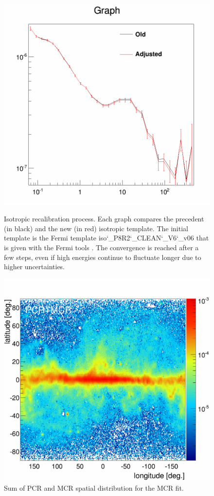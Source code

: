 \begin{figure}[H]
\begin{minipage}[h]{0.45\textwidth}
 	\subcaption{}
  	\label{app:app_iso_process_3}
  \end{minipage}
  \hfill
  \begin{minipage}[h]{0.45\textwidth}
  	\centering
	\includegraphics[width=1\linewidth]{pic/method/app_iso_process_4.png}
  	\subcaption{}
  	\label{app:app_iso_process_4}
  \end{minipage}
  \caption[Isotropic template convergence.]{Isotropic recalibration process. Each graph compares the precedent (in black) and the new (in red) isotropic template. The initial template is the Fermi template iso\char`_P8R2\char`_CLEAN\char`_V6\char`_v06 that is given with the Fermi tools \cite{FermiTools}. The convergence is reached after a few steps, even if high energies continue to fluctuate longer due to higher uncertainties.}
  \label{app:app_iso_process}
\end{figure}
 



\newpage
\begin{figure}[h]
  \centering
  \includegraphics[width=0.5\linewidth]{pic/discussion/MCRonly_fine_PCR+MCR_integral_distribution.png}	 
  \caption[Skymap of the PCR and MCR sum.]{Sum of PCR and MCR spatial distribution for the MCR fit.}
  \label{app:PCR+MCR_integral_distribution}	 
\end{figure}

